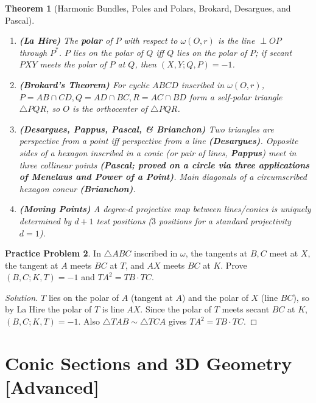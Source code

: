 \documentclass[11pt]{article}
\theoremstyle{plain}
\newtheorem{theorem}{Theorem}[section]
\theoremstyle{definition}
\newtheorem{problem}[theorem]{Practice Problem}
\newenvironment{solution}{\begin{proof}[Solution]}{\end{proof}}
\begin{document}
\begin{theorem}[Harmonic Bundles, Poles and Polars, Brokard, Desargues, and Pascal]
\leavevmode
\begin{enumerate}[label=(\alph*)]
\item \textbf{(La Hire)} The \textbf{polar} of $P$ with respect to $\omega(O,r)$ is the line $\perp OP$ through $P^*$. $P$ lies on the polar of $Q$ iff $Q$ lies on the polar of $P$; if secant $PXY$ meets the polar of $P$ at $Q$, then $(X,Y;Q,P) = -1$.
\item \textbf{(Brokard's Theorem)} For cyclic $ABCD$ inscribed in $\omega(O,r)$, $P=AB\cap CD, Q=AD\cap BC, R=AC\cap BD$ form a self-polar triangle $\triangle PQR$, so $O$ is the orthocenter of $\triangle PQR$.
\item \textbf{(Desargues, Pappus, Pascal, \& Brianchon)} Two triangles are perspective from a point iff perspective from a line \textbf{(Desargues)}. Opposite sides of a hexagon inscribed in a conic (or pair of lines, \textbf{Pappus}) meet in three collinear points \textbf{(Pascal; proved on a circle via three applications of Menelaus and Power of a Point)}. Main diagonals of a circumscribed hexagon concur \textbf{(Brianchon)}.
\item \textbf{(Moving Points)} A degree-$d$ projective map between lines/conics is uniquely determined by $d+1$ test positions ($3$ positions for a standard projectivity $d=1$).
\end{enumerate}
\end{theorem}

\begin{problem}
In $\triangle ABC$ inscribed in $\omega$, the tangents at $B, C$ meet at $X$, the tangent at $A$ meets $BC$ at $T$, and $AX$ meets $BC$ at $K$. Prove $(B, C; K, T) = -1$ and $TA^2 = TB \cdot TC$.
\end{problem}
\begin{solution}
$T$ lies on the polar of $A$ (tangent at $A$) and the polar of $X$ (line $BC$), so by La Hire the polar of $T$ is line $AX$. Since the polar of $T$ meets secant $BC$ at $K$, $(B,C;K,T) = -1$. Also $\triangle TAB \sim \triangle TCA$ gives $TA^2 = TB\cdot TC$.
\end{solution}

\section{Conic Sections and 3D Geometry [Advanced]}
\end{document}
